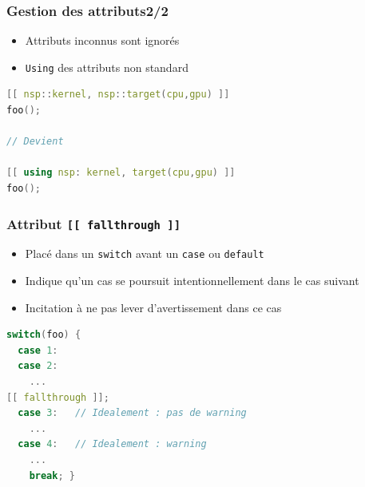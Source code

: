\documentclass[C++.tex]{subfiles}
\begin{document}
\begin{frame}[fragile]
	\frametitle{Gestion des attributs\titlehfill{}2/2}
	\begin{itemize}
		\item Attributs inconnus sont ignorés
	

		\item \lstinline|Using| des attributs non standard
	\end{itemize}

	\begin{lstlisting}[language=C++]
[[ nsp::kernel, nsp::target(cpu,gpu) ]]
foo();

// Devient

[[ using nsp: kernel, target(cpu,gpu) ]]
foo();\end{lstlisting}
\end{frame}

\begin{frame}[fragile]
	\frametitle{Attribut \lstinline|[[ fallthrough ]]|}
	\begin{itemize}
		\item Placé dans un \lstinline|switch| avant un \lstinline|case| ou \lstinline|default|
		\item Indique qu'un cas se poursuit intentionnellement dans le cas suivant
		\item Incitation à ne pas lever d'avertissement dans ce cas
	\end{itemize}


	\begin{lstlisting}[language=C++]
switch(foo) {
  case 1:
  case 2:
    ...
[[ fallthrough ]];
  case 3:   // Idealement : pas de warning
    ...
  case 4:   // Idealement : warning
    ...
    break; }\end{lstlisting}

\end{frame}
\end{document}
